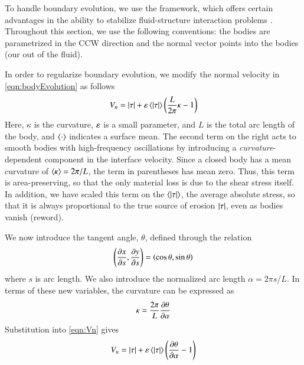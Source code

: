 \documentclass[preprint, 10pt]{elsarticle}
\begin{document}
To handle boundary evolution, we use the {\thL} framework, which offers
certain advantages in the ability to stabilize fluid-structure
interaction problems \cite{hou-low-she1994}. Throughout this section, we
use the following conventions: the bodies are parametrized in the CCW
direction and the normal vector points into the bodies (our out of the
fluid).

In order to regularize boundary evolution, we modify the normal velocity
in \eqref{eqn:bodyEvolution} as follows
\begin{equation}
\label{eqn:Vn}
V_n = \lvert \tau \rvert + \varepsilon \left< \lvert \tau \rvert \right> \left( \frac{L }{2\pi} \kappa - 1 \right)
\end{equation}
Here, $\kappa$ is the curvature, $\varepsilon$ is a small parameter, and $L$ is the total arc length of the body, and $\left< \cdot \right>$ indicates a surface mean. The second term on the right acts to smooth bodies with high-frequency oscillations by introducing a {\em curvature}-dependent component in the interface velocity. Since a closed body has a mean curvature of $\left< \kappa \right> = 2\pi / L$, the term in parentheses has mean zero. Thus, this term is area-preserving, so that the only material loss is due to the shear stress itself. In addition, we have scaled this term on the $\left< \lvert \tau \rvert \right>$, the average absolute stress, so that it is always proportional to the true source of erosion $\lvert \tau \rvert$, even as bodies vanish (reword).

We now introduce the tangent angle, $\theta$, defined through the relation
\begin{equation}
\left( \frac{\partial x}{\partial s}, \frac{\partial y}{\partial s} \right) = \left(\cos \theta, \sin \theta \right)
\end{equation}
where $s$ is arc length. We also introduce the normalized arc length $\alpha = 2 \pi s / L$. In terms of these new variables, the curvature can be expressed as
\begin{equation}
\kappa = \frac{2 \pi}{L} \frac{\partial \theta}{\partial \alpha}
\end{equation}
Substitution into \eqref{eqn:Vn} gives
\begin{equation}
\label{eqn:Vn2}
V_n = \lvert \tau \rvert +  \varepsilon \left< \lvert \tau \rvert \right>   \left(\frac{\partial \theta}{\partial \alpha} - 1 \right)
\end{equation}
\end{document}
